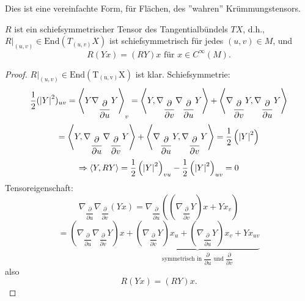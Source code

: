 \begin{remark}
	
	Dies ist eine vereinfachte Form, für Flächen, des ''wahren'' Krümmungstensors.
	
\end{remark}

\begin{lemma}
	
	$ R $ ist ein schiefsymmetrischer Tensor des Tangentialbündels $ TX $, d.h., 
	$R\big|_{(u,v)} \in \mathrm{End}(T_{(u,v)}X) $ ist schiefsymmetrisch für jedes $ (u,v) \in M $, und 
		\[ R(Yx) = (RY)x \text{ für } x \in C^\infty(M). \]
	
\end{lemma}

\begin{proof}
	
	$R\big|_{(u,v)} \in \mathrm{End(T_{(u,v)}X)}$ ist klar.
	Schiefsymmetrie:
		\[\frac12 (\left| Y\right|^2)_{uv} = \left \langle Y \nabla_{\dfrac{\partial}{\partial u}}Y \right\rangle_v = \left \langle Y, \nabla_{\dfrac{\partial}{\partial v}}\nabla_{\dfrac{\partial}{\partial u}}Y \right\rangle + \left \langle \nabla_{\dfrac{\partial}{\partial v}}Y,\nabla_{\dfrac{\partial}{\partial u}}Y \right\rangle \]
		\[ = \left \langle Y, \nabla_{\dfrac{\partial}{\partial u}}\nabla_{\dfrac{\partial}{\partial v}}Y \right\rangle + \left \langle \nabla_{\dfrac{\partial}{\partial u}}Y, \nabla_{\dfrac{\partial}{\partial v}}Y \right\rangle = \frac12 \left( \left| Y\right|^2\right)  \]
		\[ \Rightarrow \left \langle Y,RY \right\rangle = \frac12 \left(\left| Y\right|^2\right)_{vu}- \frac12\left(\left| Y\right|^2\right)_{uv}=0 \]
	Tensoreigenschaft:
		\[ \nabla_{\dfrac{\partial}{\partial u}}\nabla_{\dfrac{\partial}{\partial v}}(Yx)= \nabla_{\dfrac{\partial}{\partial u}}\left(\left( \nabla_{\dfrac{\partial}{\partial v}}Y \right)x + Yx_v\right) \]
		\[ = \left( \nabla_{\dfrac{\partial}{\partial u}} \nabla_{\dfrac{\partial}{\partial v}} Y \right)x + \underbrace{\left( \nabla_{\dfrac{\partial}{\partial v}}Y \right)x_u + \left( \nabla_{\dfrac{\partial}{\partial u}}Y \right)x_v + Yx_{uv}}_{\text{symmetrisch in } \dfrac{\partial}{\partial u} \text{ und } \dfrac{\partial}{\partial v}} \]
	also
		\[ R(Yx)=(RY)x. \]
	
\end{proof}
